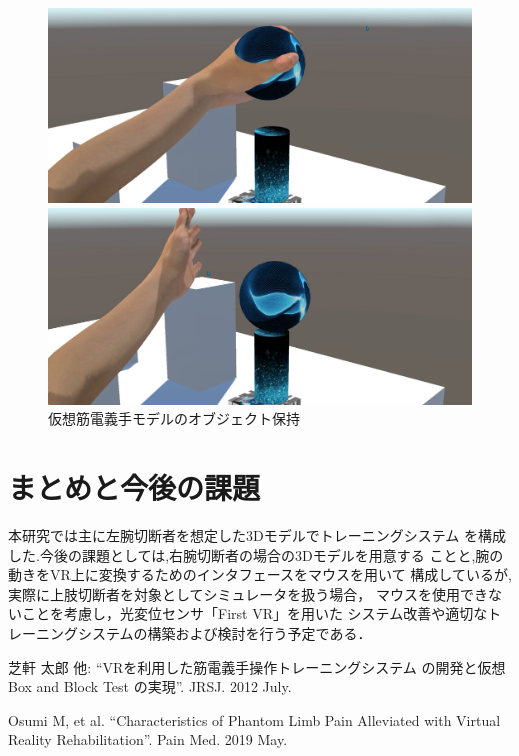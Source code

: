 \documentclass{ltjsarticle}
\begin{document}
		\begin{figure}[H]
		\centering
		\begin{minipage}{0.4\columnwidth}
		\centering
		\includegraphics[width = \columnwidth]{figs/spheregrap2.png}
		\end{minipage}
		\hspace{0.05\columnwidth}
		\begin{minipage}{0.4\columnwidth}
		\centering
		\includegraphics[width = \columnwidth]{figs/spherereleace.png}
		\end{minipage}
		\caption{仮想筋電義手モデルのオブジェクト保持}
		\label{fig:spheregrap}
		\end{figure}
		\vspace{-20pt}



\section{まとめと今後の課題}
	本研究では主に左腕切断者を想定した3Dモデルでトレーニングシステム
	を構成した.今後の課題としては,右腕切断者の場合の3Dモデルを用意する
	ことと,腕の動きをVR上に変換するためのインタフェースをマウスを用いて
	構成しているが,実際に上肢切断者を対象としてシミュレータを扱う場合，
	マウスを使用できないことを考慮し，光変位センサ「First VR」を用いた
	システム改善や適切なトレーニングシステムの構築および検討を行う予定である．
\vspace{-5pt}
\begin{thebibliography}{99}%
	芝軒 太郎 他:
	``VRを利用した筋電義手操作トレーニングシステム
	の開発と仮想 Box and Block Test の実現''. JRSJ. 2012 July.

	Osumi M, et al.
	``Characteristics of Phantom Limb Pain Alleviated with Virtual 
	Reality Rehabilitation''. Pain Med. 2019 May.
\end{thebibliography}
\end{document}
